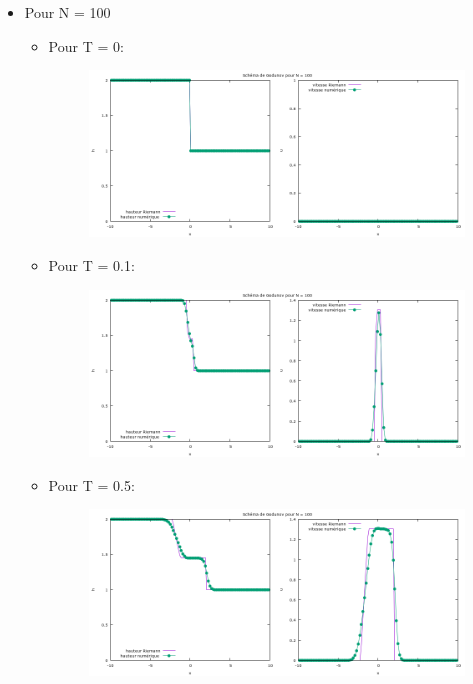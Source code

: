 \begin{itemize}
\item Pour N = 100

\newpage

\begin{itemize}
\item Pour T = 0:

\begin{figure}[h!]
	\centering \includegraphics[scale=0.5]{Images_Fichiers/tp2godu100_0.png}
\end{figure}

\item Pour T = 0.1:

\begin{figure}[h!]
	\centering \includegraphics[scale=0.5]{Images_Fichiers/tp2godu100_01.png}
\end{figure}

\newpage
\item Pour T = 0.5:

\begin{figure}[h!]
	\centering \includegraphics[scale=0.5]{Images_Fichiers/tp2godu100_05.png}
\end{figure}


\end{itemize}
\end{itemize}
